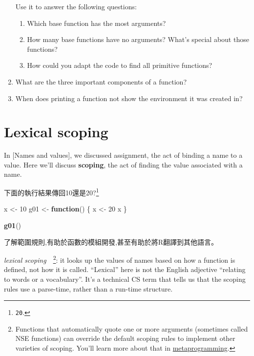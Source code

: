 \documentclass[]{book}
\newenvironment{Shaded}{\begin{snugshade}}{\end{snugshade}}
\newcommand{\ControlFlowTok}[1]{\textcolor[rgb]{0.13,0.29,0.53}{\textbf{#1}}}
\newcommand{\DecValTok}[1]{\textcolor[rgb]{0.00,0.00,0.81}{#1}}
\newcommand{\KeywordTok}[1]{\textcolor[rgb]{0.13,0.29,0.53}{\textbf{#1}}}
\newcommand{\NormalTok}[1]{#1}
\newcommand{\StringTok}[1]{\textcolor[rgb]{0.31,0.60,0.02}{#1}}
\let\rmarkdownfootnote\footnote%
\def\footnote{\protect\rmarkdownfootnote}
\theoremstyle{definition}
\theoremstyle{definition}
\theoremstyle{definition}
\theoremstyle{remark}
\begin{document}
\begin{enumerate}
  Use it to answer the following questions:

  \begin{enumerate}
  \def\labelenumii{\alph{enumii}.}
  \item
    Which base function has the most arguments?
  \item
    How many base functions have no arguments? What's special about
    those functions?
  \item
    How could you adapt the code to find all primitive functions?
  \end{enumerate}
\item
  What are the three important components of a function?
\item
  When does printing a function not show the environment it was created
  in?
\end{enumerate}

\hypertarget{lexical-scoping}{%
\section{Lexical scoping}\label{lexical-scoping}}

In {[}Names and values{]}, we discussed assignment, the act of binding a
name to a value. Here we'll discuss \textbf{scoping}, the act of finding
the value associated with a name.

下面的執行結果傳回10還是20?\footnote{\texttt{20}.}

\begin{Shaded}
\begin{Highlighting}[]
\NormalTok{x <-}\StringTok{ }\DecValTok{10}
\NormalTok{g01 <-}\StringTok{ }\ControlFlowTok{function}\NormalTok{() \{}
\NormalTok{  x <-}\StringTok{ }\DecValTok{20}
\NormalTok{  x}
\NormalTok{\}}

\KeywordTok{g01}\NormalTok{()}
\end{Highlighting}
\end{Shaded}

了解範圍規則,有助於函數的模組開發,甚至有助於將R翻譯到其他語言。

\emph{lexical scoping}　\footnote{Functions that automatically quote one
  or more arguments (sometimes called NSE functions) can override the
  default scoping rules to implement other varieties of scoping. You'll
  learn more about that in \protect\hyperlink{meta}{metaprogramming}.}:
it looks up the values of names based on how a function is defined, not
how it is called. ``Lexical'' here is not the English adjective
``relating to words or a vocabulary''. It's a technical CS term that
tells us that the scoping rules use a parse-time, rather than a run-time
structure.
\end{document}
